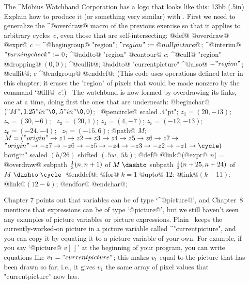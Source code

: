 {{{{\restorehsize
\ddangerexercise The ^{M\"obius} Watchband Corporation has a logo that
looks like this:
\displayfig 13bb (.5in)
Explain how to produce it (or something very similar) with \MF\!.
\answer First we need to generalize the ^@overdraw@ macro of the previous
exercise so that it applies to arbitrary cycles~$c$, even those that are
self-intersecting:
\begindisplay
@def@ @overdraw@ @expr@ $c$ = ^@begingroup@\cr
\indent@picture@ "region"; $"region":=@nullpicture@$;\cr
\indent^@interim@ $"turningcheck":=0$; ^@addto@ "region" @contour@ $c$;\cr
\indent^@cull@ "region" @dropping@ $(0,0)$;\cr
\indent^@cullit@; @addto@ "currentpicture" ^@also@ $-"region"$; @cullit@;\cr
\indent@draw@ $c$ ^@endgroup@ @enddef@;\cr
\enddisplay
(This code uses operations defined later in this chapter; it erases the
"region" of pixels that would be made nonzero by the command `@fill@~$c$'.)
\ The watchband is now formed by overdrawing its links, one at a time,
doing first the ones that are underneath:
\begindisplay
@beginchar@$("M",1.25"in"\0,.5"in"\0,0)$; \
 \pickup @pencircle@ scaled .4"pt";\cr
$z_1=(20,-13)$; \ $z_2=(30,-6)$; \ $z_3=(20,1)$; $z_4=(4,-7)$;\cr
\indent $z_5=(-12,-13)$; \ $z_6=(-24,-4)$; \ $z_7=(-15,6)$;\cr
@path@ $M$; $M=("origin"\to z1\to z2\to z3\to z4\to z5\to z6\to z7\to$\cr
\indent$"origin"\to -z7\to -z6\to -z5\to -z4\to -z3\to -z2\to -z1\to\cycle)$\cr
^^"origin" \indent\indent scaled $(h/26)$ shifted $(.5w,.5h)$;\cr
@def@ @link@(@expr@ $n$) =\cr
\indent @overdraw@ subpath ${1\over3}(n,n+1)$ of $M\;\dashto$\cr
\indent\indent  subpath ${1\over3}(n+25,n+24)$ of $M\;\dashto\;\cycle\;$
 @enddef@;\cr
@for@ $k=1$ @upto@ 12: @link@$(k+11)$; @link@$(12-k)$; @endfor@
@endchar@;\cr
\enddisplay

\danger Chapter 7 points out that variables can be of type `^@picture@',
and Chapter~8 mentions that expressions can be of type `@picture@', but
we still haven't seen any examples of picture variables or picture
expressions. Plain \MF\ keeps the currently-worked-on picture in a
picture variable called ^"currentpicture", and you can copy it by
equating it to a picture variable of your own. For example, if you
say `@picture@ $v[\,]$' at the beginning of your program, you can write
equations like
\begindisplay
$v_1="currentpicture"$;
\enddisplay
this makes $v_1$ equal to the picture that has been drawn so far; i.e.,
it gives $v_1$ the same array of pixel values that "currentpicture" now has.

}}}}
